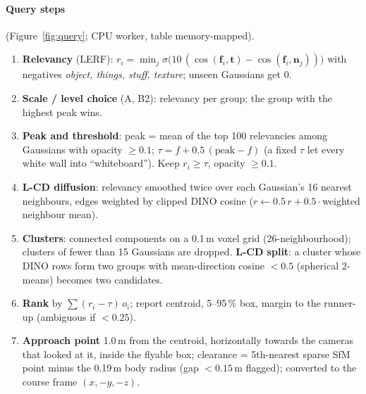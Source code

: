 \documentclass[11pt,a4paper]{article}
\newcommand{\vect}[1]{\mathbf{#1}}
\begin{document}
\paragraph{Query steps} (Figure~\ref{fig:query}; CPU worker, table memory-mapped).
\begin{enumerate}
  \item \textbf{Relevancy} (LERF): $r_i=\min_j\sigma\bigl(10\,(\cos(\vect f_i,\vect t)-\cos(\vect f_i,\vect n_j))\bigr)$
        with negatives \emph{object, things, stuff, texture}; unseen Gaussians get 0.
  \item \textbf{Scale / level choice} (A, B2): relevancy per group; the group with the highest peak wins.
  \item \textbf{Peak and threshold}: peak = mean of the top 100 relevancies among Gaussians with opacity $\ge0.1$;
        $\tau = f + 0.5\,(\mathrm{peak}-f)$ (a fixed $\tau$ let every white wall into ``whiteboard''). Keep
        $r_i\ge\tau$, opacity $\ge0.1$.
  \item \textbf{L-CD diffusion}: relevancy smoothed twice over each Gaussian's 16 nearest neighbours, edges weighted by
        clipped DINO cosine ($r\leftarrow0.5\,r+0.5\cdot$weighted neighbour mean).
  \item \textbf{Clusters}: connected components on a 0.1\,m voxel grid (26-neighbourhood); clusters of fewer than 15
        Gaussians are dropped. \textbf{L-CD split}: a cluster whose DINO rows form two groups with mean-direction cosine
        $<0.5$ (spherical 2-means) becomes two candidates.
  \item \textbf{Rank} by $\sum(r_i-\tau)\,o_i$; report centroid, 5--95\,\% box, margin to the runner-up (ambiguous if
        $<0.25$).
  \item \textbf{Approach point} 1.0\,m from the centroid, horizontally towards the cameras that looked at it, inside
        the flyable box; clearance = 5th-nearest sparse SfM point minus the 0.19\,m body radius (gap $<0.15$\,m flagged);
        converted to the course frame $(x,-y,-z)$.
\end{enumerate}
\end{document}
